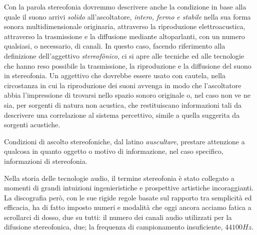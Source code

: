 \begin{refsection}
Con la parola stereofonia dovremmo descrivere anche la condizione in base alla
quale il suono arrivi \emph{solido} all'ascoltatore, \emph{intero, fermo e
stabile} nella sua forma sonora multidimensionale originaria, attraverso
la riproduzione elettroacustica, attraverso la trasmissione e la diffusione mediante
altoparlanti, con un numero qualsiasi, o necessario, di canali. In questo caso,
facendo riferimento alla definizione dell'aggettivo \emph{stereofònico}, ci
si apre alle tecniche ed alle tecnologie che hanno reso possibile la
trasmissione, la riproduzione e la diffusione del suono in stereofonia.
Un aggettivo che dovrebbe essere usato con cautela, nella circostanza in cui la
riproduzione dei suoni avvenga in modo
che l’ascoltatore abbia l’impressione di trovarsi nello spazio sonoro originale o,
nel caso non ve ne sia, per sorgenti di natura non acustica, che restituiscano
informazioni tali da descrivere una correlazione al sistema percettivo, simile a
quella suggerita da sorgenti acustiche.

Condizioni di ascolto stereofoniche, dal latino \emph{auscultare}, prestare
attenzione a qualcosa in quanto oggetto o motivo di informazione, nel caso specifico,
informazioni di stereofonia.

Nella storia delle tecnologie audio, il termine stereofonia è stato collegato
a momenti di grandi intuizioni ingenieristiche e prospettive artistiche
incoraggianti. La discografia però, con le sue rigide regole basate sul rapporto
tra semplicità ed efficacia, ha di fatto imposto numeri e modalità che oggi
ancora acciamo fatica a scrollarci di dosso, due su tutti: il numero dei
canali audio utilizzati per la difusione stereofonica, due; la frequenza di
campionamento insuficiente, $44100Hz$.









\printbibliography
\end{refsection}
